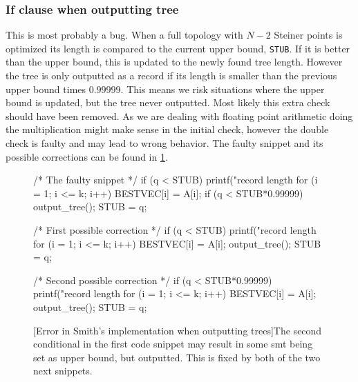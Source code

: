
\subsubsection{If clause when outputting tree}
\label{sec:if-clause-when}

This is most probably a bug. When a full topology with $N-2$ Steiner points is
optimized its length is compared to the current upper bound, \texttt{STUB}. If
it is better than the upper bound, this is updated to the newly found tree
length. However the tree is only outputted as a record if its length is smaller
than the previous upper bound times $0.99999$. This means we risk situations
where the upper bound is updated, but the tree never outputted. Most likely
this extra check should have been removed. As we are dealing with floating
point arithmetic doing the multiplication might make sense in the initial check,
however the double check is faulty and may lead to wrong behavior. The faulty
snippet and its possible corrections can be found in \cref{fig:if-clause-snippet}.

\begin{figure}[htbp]
\begin{c-code}
/* The faulty snippet */
if (q < STUB) {
  printf("\nnew record length %
  for (i = 1; i <= k; i++) BESTVEC[i] = A[i];
  if (q < STUB*0.99999) output_tree();
  STUB = q;
}

/* First possible correction */
if (q < STUB) {
  printf("\nnew record length %
  for (i = 1; i <= k; i++) BESTVEC[i] = A[i];
  output_tree();
  STUB = q;
}

/* Second possible correction */
if (q < STUB*0.99999) {
  printf("\nnew record length %
  for (i = 1; i <= k; i++) BESTVEC[i] = A[i];
  output_tree();
  STUB = q;
}
\end{c-code}
  [Error in Smith's implementation when outputting trees]{The
    second conditional in the first code snippet may result in some \gls{smt}
    being set as upper bound, but outputted. This is fixed by both of the two
    next snippets.\label{fig:if-clause-snippet}}
\end{figure}

\chapterbreak{}

